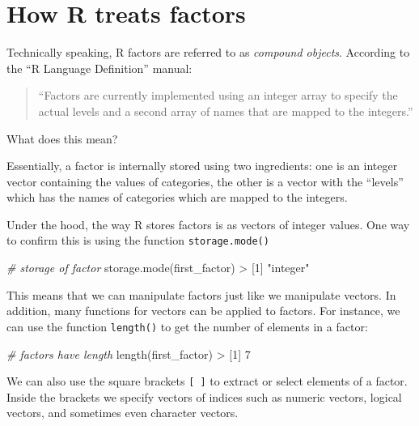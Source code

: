 \documentclass[
]{book}
\newenvironment{Shaded}{\begin{snugshade}}{\end{snugshade}}
\newcommand{\CommentTok}[1]{\textcolor[rgb]{0.56,0.35,0.01}{\textit{#1}}}
\newcommand{\DecValTok}[1]{\textcolor[rgb]{0.00,0.00,0.81}{#1}}
\newcommand{\FunctionTok}[1]{\textcolor[rgb]{0.00,0.00,0.00}{#1}}
\newcommand{\NormalTok}[1]{#1}
\newcommand{\SpecialCharTok}[1]{\textcolor[rgb]{0.00,0.00,0.00}{#1}}
\newcommand{\StringTok}[1]{\textcolor[rgb]{0.31,0.60,0.02}{#1}}
\begin{document}
\hypertarget{how-r-treats-factors}{%
\section{How R treats factors}\label{how-r-treats-factors}}

Technically speaking, R factors are referred to as \emph{compound objects}. According
to the ``R Language Definition'' manual:

\begin{quote}
``Factors are currently implemented using an integer array to specify the
actual levels and a second array of names that are mapped to the integers.''
\end{quote}

What does this mean?

Essentially, a factor is internally stored using two ingredients: one is an
integer vector containing the values of categories, the other is a vector with
the ``levels'' which has the names of categories which are mapped to the integers.

Under the hood, the way R stores factors is as vectors of integer values.
One way to confirm this is using the function \texttt{storage.mode()}

\begin{Shaded}
\begin{Highlighting}[]
\CommentTok{\# storage of factor}
\FunctionTok{storage.mode}\NormalTok{(first\_factor)}
\SpecialCharTok{\textgreater{}}\NormalTok{ [}\DecValTok{1}\NormalTok{] }\StringTok{"integer"}
\end{Highlighting}
\end{Shaded}

This means that we can manipulate factors just like we manipulate vectors. In
addition, many functions for vectors can be applied to factors. For instance,
we can use the function \texttt{length()} to get the number of elements in a factor:

\begin{Shaded}
\begin{Highlighting}[]
\CommentTok{\# factors have length}
\FunctionTok{length}\NormalTok{(first\_factor)}
\SpecialCharTok{\textgreater{}}\NormalTok{ [}\DecValTok{1}\NormalTok{] }\DecValTok{7}
\end{Highlighting}
\end{Shaded}

We can also use the square brackets \texttt{{[}\ {]}} to extract or select elements of a
factor. Inside the brackets we specify vectors of indices such as numeric
vectors, logical vectors, and sometimes even character vectors.
\end{document}
